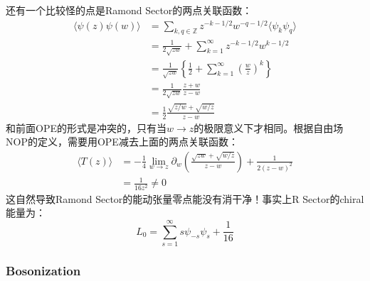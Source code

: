 还有一个比较怪的点是Ramond Sector的两点关联函数：
\begin{equation}
	\begin{aligned}
		\langle\psi(z)\psi(w)\rangle & =\sum_{k,q\in\mathbb{Z}}z^{-k-1/2}w^{-q-1/2}\langle \psi_k\psi_q\rangle   \\
		&=\frac1{2\sqrt{zw}}+\sum_{k=1}^\infty z^{-k-1/2}w^{k-1/2} \\
		&=\frac1{\sqrt{zw}}\left\{\frac12+\sum_{k=1}^\infty\left(\frac wz\right)^k\right\} \\
		&=\frac1{2\sqrt{zw}}\frac{z+w}{z-w} \\
		&=\frac12\frac{\sqrt{z/w}+\sqrt{w/z}}{z-w}
	\end{aligned}
\end{equation}
和前面OPE的形式是冲突的，只有当$w\to z$的极限意义下才相同。根据自由场NOP的定义，需要用OPE减去上面的两点关联函数：
\begin{equation}
	\begin{aligned}\langle T(z)\rangle&=-\frac14\lim_{w\to z}\partial_w\left(\frac{\sqrt{zw}+\sqrt{w/z}}{z-w}\right)+\frac1{2(z-w)^2}\\&=\frac1{16z^2}\neq 0\end{aligned}
\end{equation}
这自然导致Ramond Sector的能动张量零点能没有消干净！事实上R Sector的chiral能量为：
\begin{equation}
	L_0=\sum_{s=1}^\infty s\psi_{-s}\psi_s+\frac{1}{16}
\end{equation}
\subsubsection{Bosonization}
